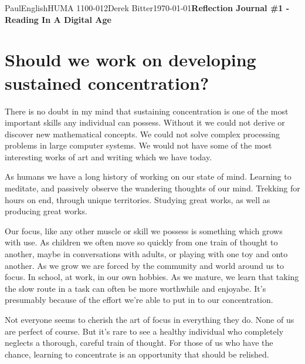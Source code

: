 \documentclass[12pt,letterpaper]{article}
\begin{document}
\begin{mla}{Paul}{English}{HUMA 1100-012}{Derek Bitter}{\today}{\textbf{Reflection Journal \#1 - Reading In A Digital Age}}

\section{Should we work on developing sustained concentration?}

There is no doubt in my mind that sustaining concentration is one of
the most important skills any individual can possess. Without it we
could not derive or discover new mathematical concepts. We could not
solve complex processing problems in large computer systems. We would
not have some of the most interesting works of art and writing which
we have today.

As humans we have a long history of working on our state of mind.
Learning to meditate, and passively observe the wandering thoughts of
our mind. Trekking for hours on end, through unique territories.
Studying great works, as well as producing great works.

Our focus, like any other muscle or skill we possess is
something which grows with use. As children we often move so quickly
from one train of thought to another, maybe in conversations with
adults, or playing with one toy and onto another. As we grow we are
forced by the community and world around us to focus. In school, at
work, in our own hobbies. As we mature, we learn that taking the slow
route in a task can often be more worthwhile and enjoyabe. It's
presumably because of the effort we're able to put in to our
concentration.

Not everyone seems to cherish the art of focus in everything they do.
None of us are perfect of course. But it's rare to see a healthy
individual who completely neglects a thorough, careful train of
thought. For those of us who have the chance, learning to concentrate
is an opportunity that should be relished.

\end{mla}
\end{document}
